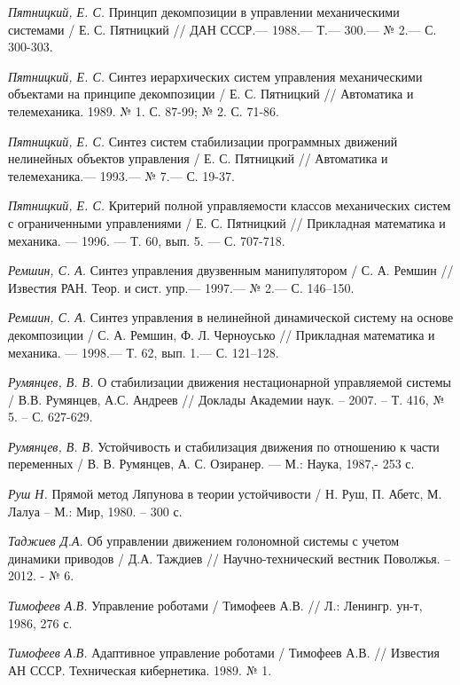 \begin{thebibliography}{10}
	{\it Пятницкий, Е. С.} Принцип декомпозиции в управлении механическими системами
	/ Е. С. Пятницкий // ДАН СССР.— 1988.— Т.— 300.— № 2.— С. 300-303.
	
	{\it Пятницкий, Е. С.} Синтез иерархических систем управления механическими объектами на принципе декомпозиции
	/ Е. С. Пятницкий // Автоматика и телемеханика. 1989. № 1. С. 87-99; № 2. С. 71-86.
	
	{\it Пятницкий, Е. С.} Синтез систем стабилизации программных движений нелинейных объектов управления
	/ Е. С. Пятницкий // Автоматика и телемеханика.— 1993.— № 7.— С. 19-37.
	
	{\it Пятницкий, Е. С.} Критерий полной управляемости классов механических систем с ограниченными управлениями 
	/ Е. С. Пятницкий // Прикладная математика и механика. — 1996. — Т. 60, вып. 5. — С. 707-718.
	
	{\it Ремшин, С. А.} Синтез управления двузвенным манипулятором /
	С. А. Ремшин // Известия РАН. Теор. и сист. упр.— 1997.— № 2.— С. 146–150.
	
	{\it Ремшин, С. А.} Синтез управления в нелинейной динамической систему на основе декомпозиции /
	С. А. Ремшин, Ф. Л. Черноусько // Прикладная математика и механика. — 1998.— Т. 62, вып. 1.— С. 121–128.
	
	{\it Румянцев, В. В.} О стабилизации движения нестационарной управляемой системы / В.В. Румянцев, А.С. Андреев // Доклады Академии наук. – 2007. 	– Т. 416, № 5. – С. 627-629.

	{\it Румянцев, В. В.} Устойчивость и стабилизация движения по отношению к части переменных /
	В. В. Румянцев, А. С. Озиранер. — М.: Наука, 1987,- 253 с.
	
	{\it Руш Н.} Прямой метод Ляпунова в теории устойчивости / Н. Руш, П. Абетс, М. Лалуа – М.: Мир, 1980. – 300 с.
	
	{\it Таджиев Д.А.} Об управлении движением голономной системы с учетом динамики приводов / Д.А. Таждиев // Научно-технический вестник Поволжья. 	– 2012. - № 6. 
	
	{\it Тимофеев А.В.} Управление роботами / Тимофеев А.В. // Л.: Ленингр. ун-т, 1986, 276 с.
	
	{\it Тимофеев А.В.} Адаптивное управление роботами / Тимофеев А.В. // Известия АН СССР. Техническая кибернетика. 1989. № 1.
	

\end{thebibliography}
